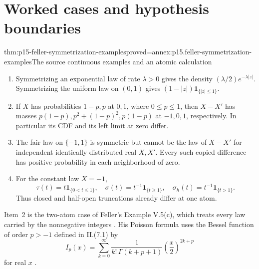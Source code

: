 \section{Worked cases and hypothesis boundaries}
\label{sec:p15-feller-worked-cases}

\begin{hbtheorem}{thm:p15-feller-symmetrization-examples}{proved=annex:p15.feller-symmetrization-examples}{The source continuous examples and an atomic calculation}
\begin{enumerate}
\item Symmetrizing an exponential law of rate \(\lambda>0\) gives
the density \((\lambda/2)e^{-\lambda|z|}\).
Symmetrizing the uniform law on \((0,1)\) gives
\((1-|z|)\mathbf1_{\{|z|\leq1\}}\).
\item If \(X\) has probabilities \(1-p,p\) at \(0,1\), where
\(0\leq p\leq1\), then \(X-X'\) has masses
\(p(1-p),p^2+(1-p)^2,p(1-p)\) at \(-1,0,1\), respectively.
In particular its CDF and its left limit at zero differ.
\item The fair law on \(\{-1,1\}\) is symmetric but cannot be
the law of \(X-X'\) for independent identically distributed real
\(X,X'\). Every such copied difference has positive probability
in each neighborhood of zero.
\item For the constant law \(X=-1\),
\[
 \tau(t)=t\mathbf1_{\{0<t\leq1\}},\quad
 \sigma(t)=t^{-1}\mathbf1_{\{t\geq1\}},\quad
 \sigma_h(t)=t^{-1}\mathbf1_{\{t>1\}}.
\]
Thus closed and half-open truncations already differ at one atom.
\end{enumerate}
\end{hbtheorem}

Item~2 is the two-atom case of Feller's Example V.5(c), which treats
every law carried by the nonnegative integers
\cite[V.5, p.~149]{Feller1971ProbabilityII}. His Poisson formula uses
the Bessel function of order \(p>-1\) defined in II.(7.1) by
\[
 I_p(x)=\sum_{k=0}^\infty\frac{1}{k!\,\Gamma(k+p+1)}
          \left(\frac x2\right)^{2k+p}
\]
for real \(x\) \cite[II.7, p.~58]{Feller1971ProbabilityII}.


